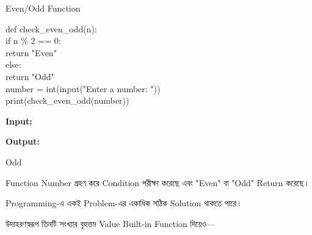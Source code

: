 \begin{codeoutputbox}{Even/Odd Function}

\noindent
\begin{minipage}[t]{0.57\linewidth}
\codeheading

\begin{english}
\ttfamily
def check\_even\_odd(n):\\
\hspace*{4mm}if n \% 2 == 0:\\
\hspace*{8mm}return "Even"\\
\hspace*{4mm}else:\\
\hspace*{8mm}return "Odd"\\[0.5mm]
number = int(input("Enter a number: "))\\
print(check\_even\_odd(number))
\end{english}

\end{minipage}
\hfill
\begin{minipage}[t]{0.39\linewidth}
\outputheading

\textbf{Input:}
\textenglish{}

\medskip

\textbf{Output:}

\textenglish{\ttfamily Odd}

\medskip

Function Number গ্রহণ করে Condition পরীক্ষা করেছে এবং
\textenglish{\ttfamily "Even"}
বা
\textenglish{\ttfamily "Odd"}
Return করেছে।

\end{minipage}

\end{codeoutputbox}



Programming-এ একই Problem-এর একাধিক সঠিক Solution থাকতে পারে।

উদাহরণস্বরূপ তিনটি সংখ্যার বৃহত্তম Value Built-in Function দিয়েও—

